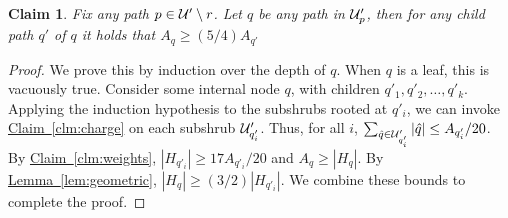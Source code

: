 \documentclass[11pt]{article}
\newtheorem{claim}[theorem]{Claim}
\theoremstyle{definition}
\newcommand{\Clm}[1]{\hyperref[clm:#1]{Claim~\ref*{clm:#1}}} %
\newcommand{\Lem}[1]{\hyperref[lem:#1]{Lemma~\ref*{lem:#1}}} %
\begin{document}
\begin{claim} \label{clm:exp-A} Fix any path $p \in {\cal U}' \setminus r$.
Let $q$ be any path in ${\cal U}'_p$, then for any child path $q'$ of $q$ it holds that $A_q \geq (5/4)A_{q'}$
\end{claim}

\begin{proof} We prove this by induction over the depth of $q$.
When $q$ is a leaf, this is vacuously true. Consider some internal node $q$,
with children $q'_1, q'_2, \ldots, q'_k$. Applying the induction
hypothesis to the subshrubs rooted at $q'_i$, we can invoke \Clm{charge}
on each subshrub ${\cal U}'_{q'_i}$. Thus, for all $i$,
$\sum_{\hat{q} \in {\cal U}'_{q'_i}} |\hat{q}| \leq A_{q'_i}/20$. 
By \Clm{weights}, 
$|H_{q'_i}| \geq 17A_{q'_i}/20$ and $A_q \geq |H_q|$.
By \Lem{geometric}, $|H_q| \geq (3/2)|H_{q'_i}|$. We combine these bounds
to complete the proof.
\end{proof}
\end{document}
